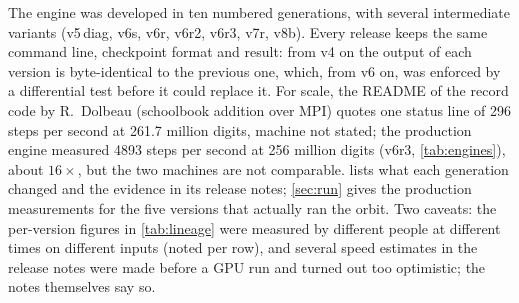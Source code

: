 \documentclass[11pt,a4paper]{article}
\theoremstyle{remark}
\begin{document}
The engine was developed in ten numbered generations, with several intermediate variants (v5\,diag, v6s, v6r, v6r2, v6r3, v7r, v8b). Every release keeps the same command line, checkpoint format and result: from v4 on the output of each version is byte-identical to the previous one, which, from v6 on, was enforced by a differential test before it could replace it. For scale, the README of the record code by R.~Dolbeau (schoolbook addition over MPI) quotes one status line of 296 steps per second at 261.7 million digits, machine not stated; the production engine measured \num{4893} steps per second at 256 million digits (v6r3, \cref{tab:engines}), about $16\times$, but the two machines are not comparable.  lists what each generation changed and the evidence in its release notes; \cref{sec:run} gives the production measurements for the five versions that actually ran the orbit. Two caveats: the per-version figures in \cref{tab:lineage} were measured by different people at different times on different inputs (noted per row), and several speed estimates in the release notes were made before a GPU run and turned out too optimistic; the notes themselves say so.
\end{document}
